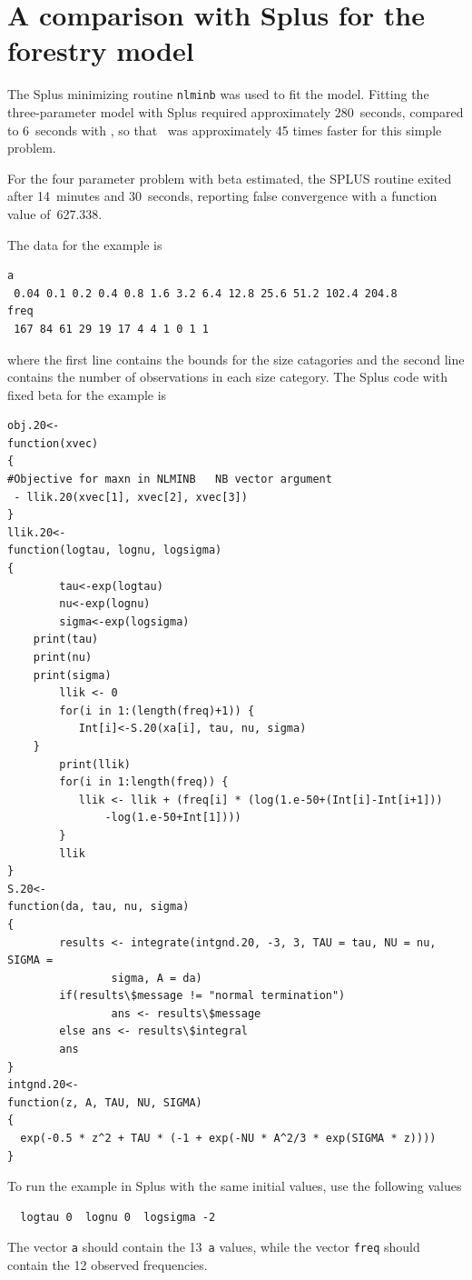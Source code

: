 \documentclass{admbmanual}
\begin{document}
\section{A comparison with Splus for the forestry model}

The Splus minimizing routine \texttt{nlminb} was used to fit the model.
Fitting the three-parameter model with Splus required
approximately 280~seconds, compared to 6~seconds with \ADM,
so that \ADM\ was approximately 45 times faster for this simple problem.

For the four parameter problem with beta estimated,
the SPLUS routine exited after
14~minutes and 30~seconds, reporting false convergence
with a function value of~627.338.

The data for the example is
\begin{lstlisting}
a
 0.04 0.1 0.2 0.4 0.8 1.6 3.2 6.4 12.8 25.6 51.2 102.4 204.8
freq
 167 84 61 29 19 17 4 4 1 0 1 1
\end{lstlisting}
where the first line contains the bounds for the size
catagories and the second line contains the number of observations
in each size category.
The Splus code with fixed beta for the example is
\begin{lstlisting}
obj.20<-
function(xvec)
{
#Objective for maxn in NLMINB   NB vector argument
 - llik.20(xvec[1], xvec[2], xvec[3])
}
llik.20<-
function(logtau, lognu, logsigma)
{
        tau<-exp(logtau)
        nu<-exp(lognu)
        sigma<-exp(logsigma)
	print(tau)
	print(nu)
	print(sigma)
        llik <- 0
        for(i in 1:(length(freq)+1)) {
           Int[i]<-S.20(xa[i], tau, nu, sigma)
	}      
        print(llik)
        for(i in 1:length(freq)) {
           llik <- llik + (freq[i] * (log(1.e-50+(Int[i]-Int[i+1])) 
               -log(1.e-50+Int[1])))
        }
        llik
}
S.20<-
function(da, tau, nu, sigma)
{
        results <- integrate(intgnd.20, -3, 3, TAU = tau, NU = nu, SIGMA =
                sigma, A = da)
        if(results\$message != "normal termination")
                ans <- results\$message
        else ans <- results\$integral
        ans
}
intgnd.20<-
function(z, A, TAU, NU, SIGMA)
{
  exp(-0.5 * z^2 + TAU * (-1 + exp(-NU * A^2/3 * exp(SIGMA * z))))
}
\end{lstlisting}
To run the example in Splus with the same initial values,
use the following values 
\begin{lstlisting}
  logtau 0  lognu 0  logsigma -2
\end{lstlisting}
The vector \texttt{a} should contain the 13~\texttt{a} values, while
the vector \texttt{freq} should contain the 12 observed frequencies.
\end{document}
